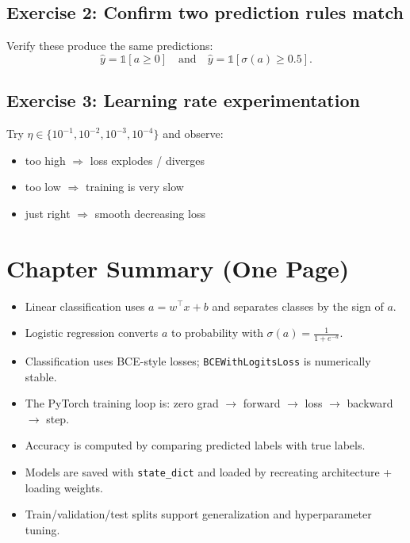 \subsection*{\color{blue!70!black}Exercise 2: Confirm two prediction rules match}
Verify these produce the same predictions:
\[
\hat{y}=\mathbb{1}[a\ge 0]
\quad \text{and} \quad
\hat{y}=\mathbb{1}[\sigma(a)\ge 0.5].
\]

\subsection*{\color{blue!70!black}Exercise 3: Learning rate experimentation}
Try $\eta \in \{10^{-1}, 10^{-2}, 10^{-3}, 10^{-4}\}$ and observe:
\begin{itemize}[leftmargin=*]
  \item too high $\Rightarrow$ loss explodes / diverges
  \item too low $\Rightarrow$ training is very slow
  \item just right $\Rightarrow$ smooth decreasing loss
\end{itemize}

\section{Chapter Summary (One Page)}
\begin{tcolorbox}[colframe=black!50,colback=black!3,title=\textbf{\color{black}You should now understand...}]
\begin{itemize}[leftmargin=*]
  \item Linear classification uses $a=w^\top x+b$ and separates classes by the sign of $a$.
  \item Logistic regression converts $a$ to probability with $\sigma(a)=\frac{1}{1+e^{-a}}$.
  \item Classification uses BCE-style losses; \texttt{BCEWithLogitsLoss} is numerically stable.
  \item The PyTorch training loop is: zero grad $\to$ forward $\to$ loss $\to$ backward $\to$ step.
  \item Accuracy is computed by comparing predicted labels with true labels.
  \item Models are saved with \texttt{state\_dict} and loaded by recreating architecture + loading weights.
  \item Train/validation/test splits support generalization and hyperparameter tuning.
\end{itemize}
\end{tcolorbox}